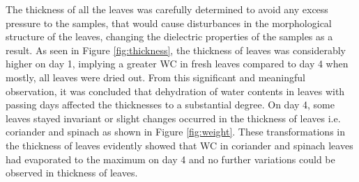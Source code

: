 \documentclass[preprints,article,accept,moreauthors,pdftex]{Definitions/mdpi}
\renewcommand{\^}{\hat}  %
\begin{document}
The thickness of all the leaves was carefully determined to avoid any excess pressure to the samples, that would cause disturbances in the morphological structure of the leaves, changing the dielectric properties of the samples as a result. As seen in Figure \ref{fig:thickness}, the thickness of leaves was considerably higher on day 1, implying a greater WC in fresh leaves compared to day 4 when mostly, all leaves were dried out. From this significant and meaningful observation, it was concluded that dehydration of water contents in leaves with passing days affected the thicknesses to a substantial degree. On day 4, some leaves stayed invariant or slight changes occurred in the thickness of leaves i.e. coriander and spinach as shown in Figure \ref{fig:weight}. These transformations in the thickness of leaves evidently showed that WC in coriander and spinach leaves had evaporated to the maximum on day 4 and no further variations could be observed in thickness of leaves.
\end{document}

